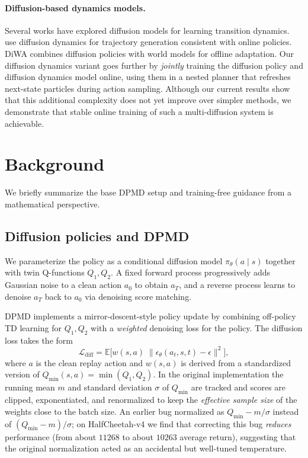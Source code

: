 \documentclass{article}
\theoremstyle{plain}
\theoremstyle{definition}
\theoremstyle{remark}
\newcommand{\E}{\mathbb{E}}
\begin{document}
\paragraph{Diffusion-based dynamics models.}
Several works have explored diffusion models for learning transition dynamics.
\citet{rigter2023worldmodels} use diffusion dynamics for trajectory generation consistent with online policies.
DiWA \citep{diwa2025} combines diffusion policies with world models for offline adaptation.
Our diffusion dynamics variant goes further by \emph{jointly} training the diffusion policy and diffusion dynamics model online, using them in a nested planner that refreshes next-state particles during action sampling.
Although our current results show that this additional complexity does not yet improve over simpler methods, we demonstrate that stable online training of such a multi-diffusion system is achievable.

\section{Background}
\label{sec:background}

We briefly summarize the base DPMD setup and training-free guidance from a mathematical perspective.

\subsection{Diffusion policies and DPMD}

We parameterize the policy as a conditional diffusion model $\pi_\theta(a\mid s)$ together with twin Q-functions $Q_1,Q_2$.
A fixed forward process progressively adds Gaussian noise to a clean action $a_0$ to obtain $a_T$, and a reverse process learns to denoise $a_T$ back to $a_0$ via denoising score matching.

DPMD implements a mirror-descent-style policy update by combining off-policy TD learning for $Q_1,Q_2$ with a \emph{weighted} denoising loss for the policy.
The diffusion loss takes the form
\begin{equation}
  \mathcal{L}_{\text{diff}} = \E\big[ w(s,a) \; \| \epsilon_\theta(a_t,s,t) - \epsilon \|^2 \big],
\end{equation}
where $a$ is the clean replay action and $w(s,a)$ is derived from a standardized version of $Q_{\min}(s,a) = \min(Q_1,Q_2)$.
In the original implementation the running mean $m$ and standard deviation $\sigma$ of $Q_{\min}$ are tracked and scores are clipped, exponentiated, and renormalized to keep the \emph{effective sample size} of the weights close to the batch size.
An earlier bug normalized as $Q_{\min} - m/\sigma$ instead of $(Q_{\min}-m)/\sigma$; on HalfCheetah-v4 we find that correcting this bug \emph{reduces} performance (from about $11268$ to about $10263$ average return), suggesting that the original normalization acted as an accidental but well-tuned temperature.
\end{document}
